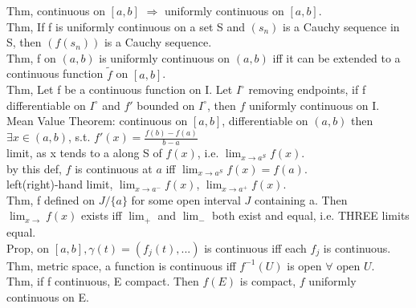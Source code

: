 \documentclass[paper=a4, fontsize=11pt]{scrartcl} %
\numberwithin{equation}{section} %
\numberwithin{figure}{section} %
\numberwithin{table}{section} %
\begin{document}
Thm, continuous on $[a,b]$ $\Rightarrow$ uniformly continuous on $[a,b]$.\\
Thm, If f is uniformly continuous on a set S and $(s_n)$ is a Cauchy sequence in S, then $(f(s_n))$ is a Cauchy sequence.\\
Thm, f on $(a,b)$ is uniformly continuous on $(a,b)$ iff it can be extended to a continuous function $\tilde{f}$ on $[a,b]$.\\
Thm, Let f be a continuous function on I. Let $I^\circ$ removing endpoints, if f differentiable on $I^\circ$ and $f'$ bounded on $I^\circ$, then $f$ uniformly continuous on I.\\
Mean Value Theorem: continuous on $[a,b]$, differentiable on $(a,b)$ then $\exists x\in(a,b)$, s.t. $f'(x) = \frac{f(b)-f(a)}{b-a}$\\
limit, as x tends to a along S of $f(x)$, i.e. $\lim_{x\rightarrow a^S} f(x)$.\\
by this def, $f$ is continuous at $a$ iff $\lim_{x\rightarrow a^S} f(x) = f(a)$.\\
left(right)-hand limit, $\lim_{x\rightarrow a^-} f(x)$, $\lim_{x\rightarrow a^+} f(x)$.\\
Thm, f defined on $J/\{a\}$ for some open interval $J$ containing a. Then $\lim_{x\rightarrow}f(x)$ exists iff $\lim_+$ and $\lim_-$ both exist and equal, i.e. THREE limits equal.\\
Prop, on $[a,b], $$\gamma(t) = (f_j(t),...)$ is continuous iff each $f_j$ is continuous.\\
Thm, metric space, a function is continuous iff $f^{-1}(U)$ is open $\forall $ open $U$.\\
Thm, if f continuous, E compact. Then $f(E)$ is compact, $f$ uniformly continuous on E. 
\end{document}
